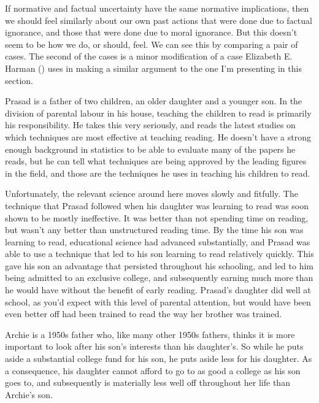 \documentclass[
  10pt,
  letterpaper,
  twoside]{scrbook}
\begin{document}
If normative and factual uncertainty have the same normative
implications, then we should feel similarly about our own past actions
that were done due to factual ignorance, and those that were done due to
moral ignorance. But this doesn't seem to be how we do, or should, feel.
We can see this by comparing a pair of cases. The second of the cases is
a minor modification of a case Elizabeth E. Harman
() uses in making a similar argument to
the one I'm presenting in this section.

{Prasad} is a father of two children, an older daughter and a younger
son. In the division of parental labour in his house, teaching the
children to read is primarily his responsibility. He takes this very
seriously, and reads the latest studies on which techniques are most
effective at teaching reading. He doesn't have a strong enough
background in statistics to be able to evaluate many of the papers he
reads, but he can tell what techniques are being approved by the leading
figures in the field, and those are the techniques he uses in teaching
his children to read.

Unfortunately, the relevant science around here moves slowly and
fitfully. The technique that {Prasad} followed when his daughter was
learning to read was soon shown to be mostly ineffective. It was better
than not spending time on reading, but wasn't any better than
unstructured reading time. By the time his son was learning to read,
educational science had advanced substantially, and {Prasad} was able to
use a technique that led to his son learning to read relatively quickly.
This gave his son an advantage that persisted throughout his schooling,
and led to him being admitted to an exclusive college, and subsequently
earning much more than he would have without the benefit of early
reading. {Prasad}'s daughter did well at school, as you'd expect with
this level of parental attention, but would have been even better off
had been trained to read the way her brother was trained.

{Archie} is a 1950s father who, like many other 1950s fathers, thinks it
is more important to look after his son's interests than his daughter's.
So while he puts aside a substantial college fund for his son, he puts
aside less for his daughter. As a consequence, his daughter cannot
afford to go to as good a college as his son goes to, and subsequently
is materially less well off throughout her life than {Archie}'s son.
\end{document}
